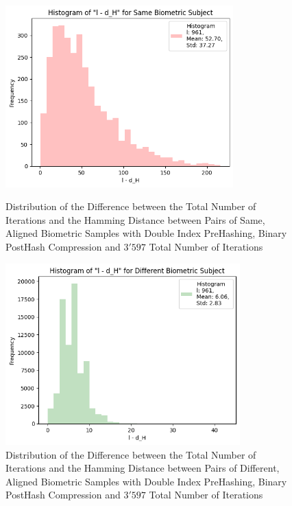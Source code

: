 \begin{enumerate}
\begin{itemize}
            \begin{figure}[H]
                \centering
                \begin{minipage}[b]{0.48\linewidth}
                    \centering
                    \includegraphics[width=\linewidth,height=7cm,keepaspectratio]{latex-img/l-dHconfig2_same.png}
                    \caption{Distribution of the Difference between the Total Number of Iterations and the Hamming Distance between Pairs of Same, Aligned Biometric Samples with Double Index PreHashing, Binary PostHash Compression and $3'597$ Total Number of Iterations}
                    \label{l-dHconfig2_same}
                \end{minipage}
                \hfill
                \begin{minipage}[b]{0.48\linewidth}
                    \centering
                    \includegraphics[width=\linewidth,height=7cm,keepaspectratio]{latex-img/l-dHconfig2_diff.png}
                    \caption{Distribution of the Difference between the Total Number of Iterations and the Hamming Distance between Pairs of Different, Aligned Biometric Samples with Double Index PreHashing, Binary PostHash Compression and $3'597$ Total Number of Iterations}
                    \label{l-dHconfig2_diff}
                \end{minipage}
            \end{figure}


\end{itemize}
\end{enumerate}
